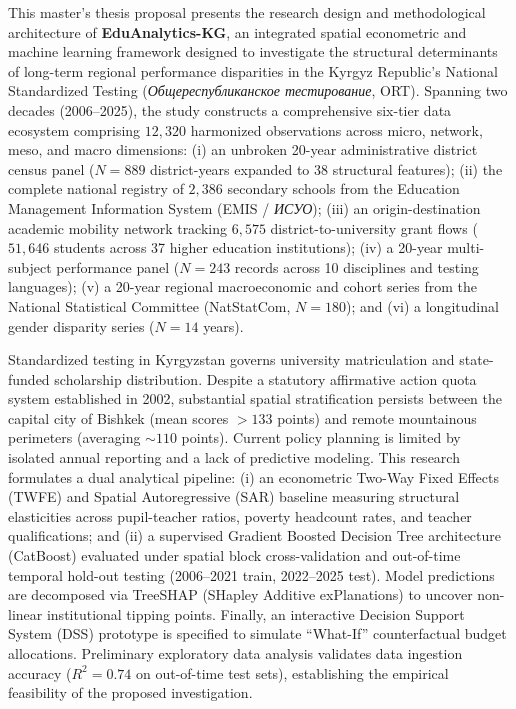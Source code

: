 \documentclass[12pt,letterpaper]{report}
\begin{document}
This master's thesis proposal presents the research design and methodological architecture of \textbf{EduAnalytics-KG}, an integrated spatial econometric and machine learning framework designed to investigate the structural determinants of long-term regional performance disparities in the Kyrgyz Republic's National Standardized Testing (\textit{Общереспубликанское тестирование}, ORT). Spanning two decades (2006--2025), the study constructs a comprehensive six-tier data ecosystem comprising $12,320$ harmonized observations across micro, network, meso, and macro dimensions: (i) an unbroken 20-year administrative district census panel ($N = 889$ district-years expanded to 38 structural features); (ii) the complete national registry of $2,386$ secondary schools from the Education Management Information System (EMIS / \textit{ИСУО}); (iii) an origin-destination academic mobility network tracking $6,575$ district-to-university grant flows ($51,646$ students across 37 higher education institutions); (iv) a 20-year multi-subject performance panel ($N = 243$ records across 10 disciplines and testing languages); (v) a 20-year regional macroeconomic and cohort series from the National Statistical Committee (NatStatCom, $N = 180$); and (vi) a longitudinal gender disparity series ($N = 14$ years).

Standardized testing in Kyrgyzstan governs university matriculation and state-funded scholarship distribution. Despite a statutory affirmative action quota system established in 2002, substantial spatial stratification persists between the capital city of Bishkek (mean scores $>133$ points) and remote mountainous perimeters (averaging $\sim 110$ points). Current policy planning is limited by isolated annual reporting and a lack of predictive modeling. This research formulates a dual analytical pipeline: (i) an econometric Two-Way Fixed Effects (TWFE) and Spatial Autoregressive (SAR) baseline measuring structural elasticities across pupil-teacher ratios, poverty headcount rates, and teacher qualifications; and (ii) a supervised Gradient Boosted Decision Tree architecture (CatBoost) evaluated under spatial block cross-validation and out-of-time temporal hold-out testing (2006--2021 train, 2022--2025 test). Model predictions are decomposed via TreeSHAP (SHapley Additive exPlanations) to uncover non-linear institutional tipping points. Finally, an interactive Decision Support System (DSS) prototype is specified to simulate ``What-If'' counterfactual budget allocations. Preliminary exploratory data analysis validates data ingestion accuracy ($R^2 = 0.74$ on out-of-time test sets), establishing the empirical feasibility of the proposed investigation.
\end{document}
